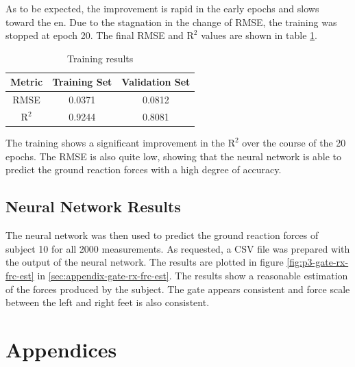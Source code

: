 \documentclass[12pt]{article}
\begin{document}
As to be expected, the improvement is rapid in the early epochs and slows toward the en. Due to the stagnation in the change of RMSE, the training was stopped at epoch 20. The final RMSE and $\text{R}^2$ values are shown in table \ref{tab:p3-training-results}.

\begin{table}[H]
    \centering
    \caption{Training results}
    \label{tab:p3-training-results}
    \begin{tabular}{|c|c|c|}
        \hline
        \textbf{Metric} & \textbf{Training Set} & \textbf{Validation Set}\\
        \hline
        RMSE & 0.0371 & 0.0812 \\
        \hline
        $\text{R}^2$ & 0.9244 & 0.8081\\
        \hline
    \end{tabular}
\end{table}

The training shows a significant improvement in the $\text{R}^2$ over the course of the 20 epochs. The RMSE is also quite low, showing that the neural network is able to predict the ground reaction forces with a high degree of accuracy.

\subsection{Neural Network Results}
The neural network was then used to predict the ground reaction forces of subject 10 for all 2000 measurements. As requested, a CSV file was prepared with the output of the neural network. The results are plotted in figure \ref{fig:p3-gate-rx-frc-est} in \ref{sec:appendix-gate-rx-frc-est}. The results show a reasonable estimation of the forces produced by the subject. The gate appears consistent and force scale between the left and right feet is also consistent.

\clearpage

\clearpage
\section*{Appendices} \label{sec:appendix}
\renewcommand\thesubsection{Appendix \Alph{subsection}}
\renewcommand\thesubsubsection{Appendix \Alph{subsection}-\arabic{subsubsection}}
\end{document}
